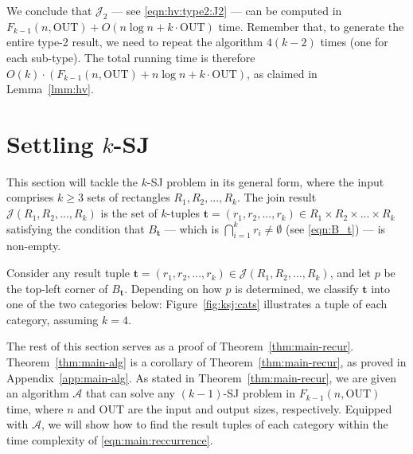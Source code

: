 \documentclass[acmsmall,review,anonymous]{acmart}
\def\vgap{\vspace{1mm}}
\def\A{\mathcal{A}}
\def\J{\mathcal{J}}
\def\out{\mathrm{OUT}}
\begin{document}
{{{\vgap 

We conclude that $\J_2$ --- see \eqref{eqn:hv:type2:J2} --- can be computed in $F_{k-1}(n, \out) + O(n \log n +  k \cdot \out)$ time. Remember that, to generate the entire type-2 result, we need to repeat the algorithm $4(k-2)$ times (one for each sub-type). The total running time is therefore $O(k) \cdot (F_{k-1}(n, \out) + n \log n +  k \cdot \out)$, as claimed in Lemma~\ref{lmm:hv}.


\section{Settling $k$-SJ} \label{sec:ksj}

This section will tackle the $k$-SJ problem in its general form, where the input comprises $k \ge 3$ sets of rectangles $R_1, R_2, ..., R_k$. The join result $\J(R_1, R_2, ..., R_k)$ is the set of $k$-tuples $\bm{t} = (r_1, r_2, ..., r_k) \in R_1 \times R_2 \times ... \times R_k$ satisfying the condition that $B_\bm{t}$ --- which is $\bigcap_{i=1}^k r_i \ne \emptyset$ (see \eqref{eqn:B_t}) --- is non-empty.

\vgap 

Consider any result tuple $\bm{t} = (r_1, r_2, ..., r_k) \in \J(R_1, R_2, ..., R_k)$, and let $p$ be the top-left corner of $B_\bm{t}$. Depending on how $p$ is determined, we classify $\bm{t}$ into one of the two categories below: 
Figure~\ref{fig:ksj:cats} illustrates a tuple of each category, assuming $k=4$. 

\vgap

The rest of this section serves as a proof of Theorem~\ref{thm:main-recur}. Theorem~\ref{thm:main-alg} is a corollary of Theorem~\ref{thm:main-recur}, as proved in Appendix~\ref{app:main-alg}. As stated in Theorem~\ref{thm:main-recur}, we are given an algorithm $\A$ that can solve any $(k-1)$-SJ problem in $F_{k-1}(n, \out)$ time, where $n$ and $\out$ are the input and output sizes, respectively. Equipped with $\A$, we will show how to find the result tuples of each category within the time complexity of \eqref{eqn:main:reccurrence}.

}}}
\end{document}
